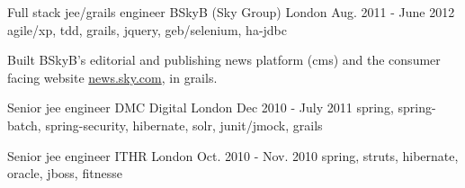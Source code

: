 \begin{cventries}
  \cventry
    {Full stack jee/grails engineer} %
    {\hspace{0.4em}BSkyB (Sky Group)} %
    {London} %
    {Aug. 2011 - June 2012} %
    {agile/xp, tdd, grails, jquery, geb/selenium, ha-jdbc} %
    {
      \begin{cvitems} %
        \item {Built BSkyB's editorial and publishing news platform (cms) and the consumer facing website \url{news.sky.com}, in grails.}
      \end{cvitems}
    }

  \cventry
    {Senior jee engineer} %
    {\hspace{0.5em}DMC Digital} %
    {London} %
    {Dec 2010 - July 2011} %
    {spring, spring-batch, spring-security, hibernate, solr, junit/jmock, grails} %
    {}

  \cventry
    {Senior jee engineer} %
    {\hspace{0.5em}ITHR} %
    {London} %
    {Oct. 2010 - Nov. 2010} %
    {spring, struts, hibernate, oracle, jboss, fitnesse} %
    {}
\end{cventries}



